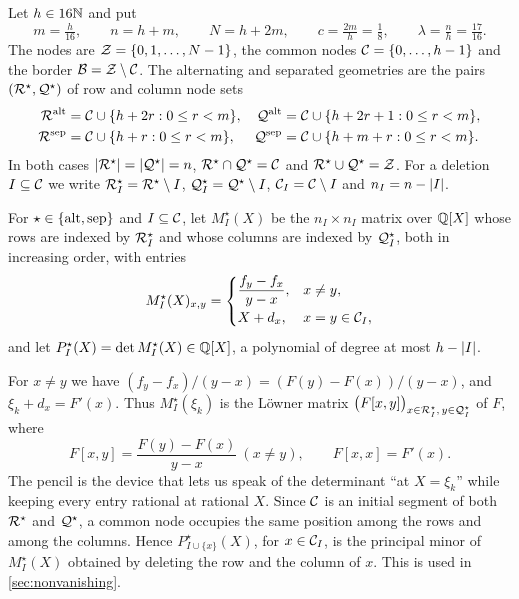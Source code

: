 \begin{definition}[Geometries]\label{def:geometries}
Let $h\in16\mathbb{N}$ and put
\[
  m=\tfrac h{16},\qquad n=h+m,\qquad N=h+2m,\qquad c=\tfrac{2m}h=\tfrac18,\qquad
  \lambda=\tfrac nh=\tfrac{17}{16}.
\]
The nodes are $\mathcal{Z}=\{0,1,\dots,N-1\}$, the common nodes
$\mathcal{C}=\{0,\dots,h-1\}$ and the border $\mathcal{B}=\mathcal{Z}\setminus\mathcal{C}$. The alternating and separated
geometries are the pairs $(\mathcal{R}^\star,\mathcal{Q}^\star)$ of row and column node sets
\begin{align*}
  \mathcal{R}^{\mathrm{alt}}&=\mathcal{C}\cup\{h+2r:0\le r<m\}, & \mathcal{Q}^{\mathrm{alt}}&=\mathcal{C}\cup\{h+2r+1:0\le r<m\},\\
  \mathcal{R}^{\mathrm{sep}}&=\mathcal{C}\cup\{h+r:0\le r<m\}, & \mathcal{Q}^{\mathrm{sep}}&=\mathcal{C}\cup\{h+m+r:0\le r<m\}.
\end{align*}
In both cases $\lvert \mathcal{R}^\star\rvert=\lvert \mathcal{Q}^\star\rvert=n$, $\mathcal{R}^\star\cap\mathcal{Q}^\star=\mathcal{C}$ and
$\mathcal{R}^\star\cup\mathcal{Q}^\star=\mathcal{Z}$. For a deletion $I\subseteq\mathcal{C}$ we write
$\mathcal{R}^\star_I=\mathcal{R}^\star\setminus I$, $\mathcal{Q}^\star_I=\mathcal{Q}^\star\setminus I$,
$\mathcal{C}_I=\mathcal{C}\setminus I$ and $n_I=n-\lvert I\rvert$.
\end{definition}

\begin{definition}\label{def:pencil}
For $\star\in\{\mathrm{alt},\mathrm{sep}\}$ and $I\subseteq\mathcal{C}$, let $M^\star_I(X)$ be the $n_I\times n_I$
matrix over $\mathbb{Q}[X]$ whose rows are indexed by $\mathcal{R}^\star_I$ and whose columns are indexed by
$\mathcal{Q}^\star_I$, both in increasing order, with entries
\[
  M^\star_I(X)_{x,y}=\begin{cases}\dfrac{f_y-f_x}{y-x}, & x\ne y,\\[2mm]
  X+d_x, & x=y\in\mathcal{C}_I,\end{cases}
\]
and let $P^\star_I(X)=\det M^\star_I(X)\in\mathbb{Q}[X]$, a polynomial of degree at most $h-\lvert I\rvert$.
\end{definition}

For $x\ne y$ we have $(f_y-f_x)/(y-x)=(F(y)-F(x))/(y-x)$, and $\xi_k+d_x=F'(x)$. Thus
$M^\star_I(\xi_k)$ is the L\"owner matrix
$\bigl(F[x,y]\bigr)_{x\in\mathcal{R}^\star_I,\,y\in\mathcal{Q}^\star_I}$ of $F$, where
\begin{equation}\label{eq:divided-difference}
  F[x,y]=\frac{F(y)-F(x)}{y-x}\ (x\ne y),\qquad F[x,x]=F'(x).
\end{equation}
The pencil is the device that lets us speak of the determinant ``at $X=\xi_k$'' while keeping
every entry rational at rational $X$. Since $\mathcal{C}$ is an initial segment of both $\mathcal{R}^\star$ and
$\mathcal{Q}^\star$, a common node occupies the same position among the rows and among the columns.
Hence $P^\star_{I\cup\{x\}}(X)$, for $x\in\mathcal{C}_I$, is the principal minor of $M^\star_I(X)$
obtained by deleting the row and the column of $x$. This is used in \cref{sec:nonvanishing}.

